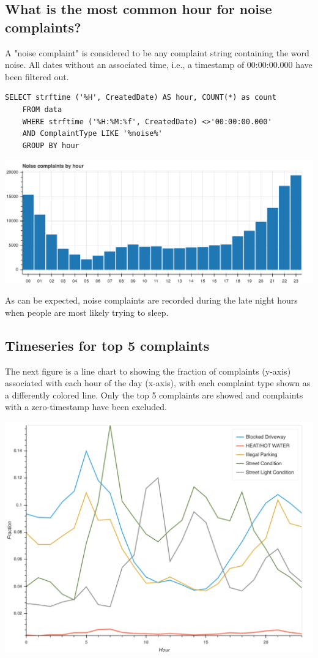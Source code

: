 \documentclass[12pt,a4paper]{article}
\begin{document}
\subsection{What is the most common hour for noise complaints?}
A "noise complaint" is considered to be any complaint string containing the word noise. All dates without an associated time, i.e., a timestamp of 00:00:00.000 have been filtered out.

\begin{verbatim}
SELECT strftime ('%H', CreatedDate) AS hour, COUNT(*) as count
    FROM data
    WHERE strftime ('%H:%M:%f', CreatedDate) <>'00:00:00.000'
    AND ComplaintType LIKE '%noise%'
    GROUP BY hour
\end{verbatim}

\includegraphics[scale=0.3]{noisecomplaintsbyhour}

As can be expected, noise complaints are recorded during the late night hours when people are most likely trying to sleep.

\subsection{Timeseries for top 5 complaints}
The next figure is a line chart to showing the fraction of complaints (y-axis) associated with each hour of the day (x-axis), with each complaint type shown as a differently colored line. Only the top 5 complaints are showed and complaints with a zero-timestamp have been excluded.

\includegraphics[scale=0.2]{timeseries}
\end{document}
